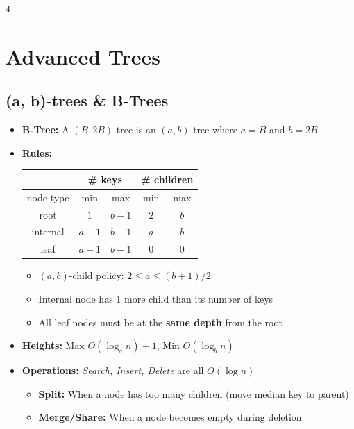 \documentclass[fontsize=6pt, landscape, a4paper]{scrartcl}
\begin{document}
\begin{multicols*}{4}
    \section*{Advanced Trees}
    \subsection*{(a, b)-trees \& B-Trees}
    \begin{itemize}
        \item \textbf{B-Tree:} A $(B, 2B)$-tree is an $(a, b)$-tree where $a=B$ and $b=2B$
        \item \textbf{Rules:}
              \newline \vspace{5pt}
              \begin{minipage}{\linewidth}
                  \begin{tabular}{|c|c|c|c|c|}
                      \hline
                                & \multicolumn{2}{c|}{\# keys} & \multicolumn{2}{c|}{\# children}
                      \\\hline
                      node type & min                          & max                              & min & max
                      \\\hline
                      root      & $1$                          & $b-1$                            & $2$ & $b$
                      \\\hline
                      internal  & $a-1$                        & $b-1$                            & $a$ & $b$
                      \\\hline
                      leaf      & $a-1$                        & $b-1$                            & $0$ & $0$
                      \\\hline
                  \end{tabular}
              \end{minipage}
              \begin{itemize}
                  \item $(a, b)$-child policy: $2 \leq a \leq (b+1)/2$
                  \item Internal node has 1 more child than its number of keys
                  \item All leaf nodes must be at the \textbf{same depth} from the root
              \end{itemize}
        \item \textbf{Heights:} Max $O(\log_a n) + 1$, Min $O(\log_b n)$
        \item \textbf{Operations:} \textit{Search, Insert, Delete} are all $O(\log n)$
              \begin{itemize}
                  \item \textbf{Split:} When a node has too many children (move median key to parent)
                  \item \textbf{Merge/Share:} When a node becomes empty during deletion
              \end{itemize}
    \end{itemize}


\end{multicols*}
\end{document}
